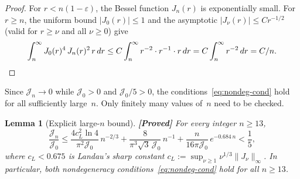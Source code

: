 \documentclass[12pt]{article}
\newtheorem{lemma}[theorem]{Lemma}
\theoremstyle{definition}
\theoremstyle{remark}
\newcommand{\proven}{\textbf{\color{teal}[Proved]}}
\begin{document}
\begin{proof}
  For $r<n(1-\varepsilon)$, the Bessel function $J_n(r)$ is exponentially
  small.  For $r\geq n$, the uniform bound $|J_0(r)|\leq 1$ and the
  asymptotic $|J_\nu(r)|\leq Cr^{-1/2}$ (valid for $r\geq\nu$ and all
  $\nu\geq 0$) give
  \[
    \int_n^\infty J_0(r)^4\,J_n(r)^2\,r\,dr
    \leq C\int_n^\infty r^{-2}\cdot r^{-1}\cdot r\,dr
    = C\int_n^\infty r^{-2}\,dr = C/n.  \qedhere
  \]
\end{proof}

Since $\mathcal J_n\to 0$ while $\mathcal J_0>0$ and
$\mathcal J_0/5>0$, the conditions~\eqref{eq:nondeg-cond} hold for all
sufficiently large~$n$.  Only finitely many values of~$n$ need to be
checked.

\begin{lemma}[Explicit large-$n$ bound]
  \label{lem:Jn-explicit}
  \proven\quad
  For every integer $n\geq 13$,
  \begin{equation}\label{eq:Jn-explicit}
    \frac{\mathcal J_n}{\mathcal J_0}
    \leq
    \frac{4c_L^2\ln 4}{\pi^2\mathcal J_0}\,n^{-2/3}
    +\frac{8}{\pi^3\sqrt3\,\mathcal J_0}\,n^{-1}
    +\frac{n}{16\pi\mathcal J_0}\,e^{-0.684\,n}
    < \frac{1}{5},
  \end{equation}
  where $c_L<0.675$ is Landau's sharp constant
  $c_L:=\sup_{\nu\geq 1}\nu^{1/3}\|J_\nu\|_\infty$.
  In particular, both nondegeneracy conditions~\eqref{eq:nondeg-cond}
  hold for all $n\geq 13$.
\end{lemma}
\end{document}
